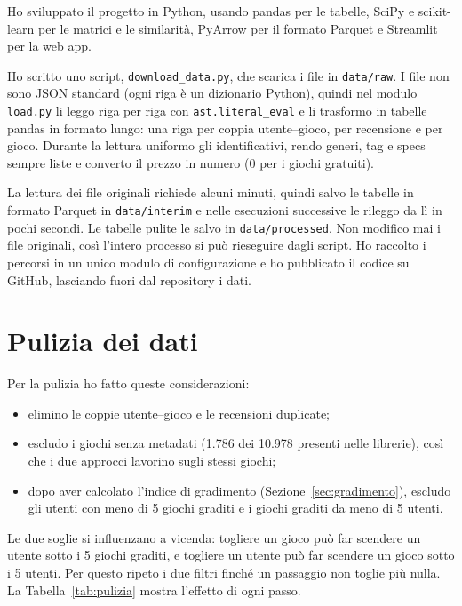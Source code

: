 \documentclass[11pt,a4paper]{article}
\begin{document}
Ho sviluppato il progetto in Python, usando pandas per le tabelle, SciPy e
scikit-learn per le matrici e le similarità, PyArrow per il formato Parquet e
Streamlit per la web app.

Ho scritto uno script, \texttt{download\_data.py}, che scarica i file in
\texttt{data/raw}. I file non sono JSON standard (ogni riga è un dizionario
Python), quindi nel modulo \texttt{load.py} li leggo riga per riga con
\texttt{ast.literal\_eval} e li trasformo in tabelle pandas in formato lungo: una
riga per coppia utente--gioco, per recensione e per gioco. Durante la lettura
uniformo gli identificativi, rendo generi, tag e specs sempre liste e converto il
prezzo in numero (0 per i giochi gratuiti).

La lettura dei file originali richiede alcuni minuti, quindi salvo le tabelle in
formato Parquet in \texttt{data/interim} e nelle esecuzioni successive le rileggo
da lì in pochi secondi. Le tabelle pulite le salvo in \texttt{data/processed}.
Non modifico mai i file originali, così l'intero processo si può rieseguire dagli
script. Ho raccolto i percorsi in un unico modulo di configurazione e ho
pubblicato il codice su GitHub, lasciando fuori dal repository i dati.

\section{Pulizia dei dati}

Per la pulizia ho fatto queste considerazioni:
\begin{itemize}
  \item elimino le coppie utente--gioco e le recensioni duplicate;
  \item escludo i giochi senza metadati (1.786 dei 10.978 presenti nelle
        librerie), così che i due approcci lavorino sugli stessi giochi;
  \item dopo aver calcolato l'indice di gradimento
        (Sezione~\ref{sec:gradimento}), escludo gli utenti con meno di 5 giochi
        graditi e i giochi graditi da meno di 5 utenti.
\end{itemize}

Le due soglie si influenzano a vicenda: togliere un gioco può far scendere un
utente sotto i 5 giochi graditi, e togliere un utente può far scendere un gioco
sotto i 5 utenti. Per questo ripeto i due filtri finché un passaggio non toglie
più nulla. La Tabella~\ref{tab:pulizia} mostra l'effetto di ogni passo.
\end{document}
